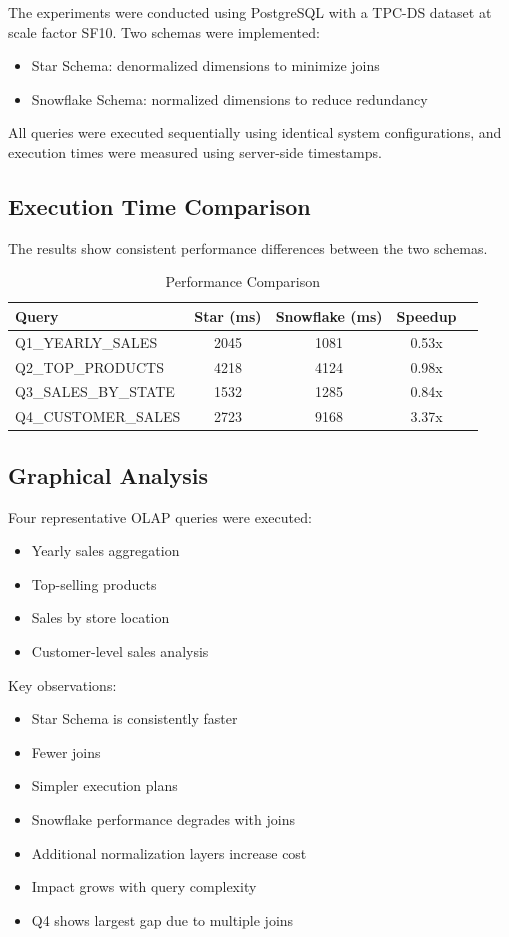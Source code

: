 \documentclass[conference]{IEEEtran}
\begin{document}
The experiments were conducted using PostgreSQL with a TPC-DS dataset at scale factor SF10. Two schemas were implemented:

\begin{itemize}
\item Star Schema: denormalized dimensions to minimize joins
\item Snowflake Schema: normalized dimensions to reduce redundancy
\end{itemize}

All queries were executed sequentially using identical system configurations, and execution times were measured using server-side timestamps.

\subsection{Execution Time Comparison}

The results show consistent performance differences between the two schemas.
\begin{table}[h]
\centering
\caption{Performance Comparison}
\begin{tabular}{lcccc}
\toprule
Query & Star (ms) & Snowflake (ms) & Speedup \\
\midrule
Q1\_YEARLY\_SALES & 2045 & 1081 & 0.53x \\
Q2\_TOP\_PRODUCTS & 4218 & 4124 & 0.98x \\
Q3\_SALES\_BY\_STATE & 1532 & 1285 & 0.84x \\
Q4\_CUSTOMER\_SALES & 2723 & 9168 & 3.37x \\
\bottomrule
\end{tabular}
\end{table}

\subsection{Graphical Analysis}
Four representative OLAP queries were executed:

\begin{itemize}
\item Yearly sales aggregation
\item Top-selling products
\item Sales by store location
\item Customer-level sales analysis
\end{itemize}

Key observations:

\begin{itemize}
\item Star Schema is consistently faster
\item Fewer joins
\item Simpler execution plans
\item Snowflake performance degrades with joins
\item Additional normalization layers increase cost
\item Impact grows with query complexity
\item Q4 shows largest gap due to multiple joins
\end{itemize}
\end{document}
